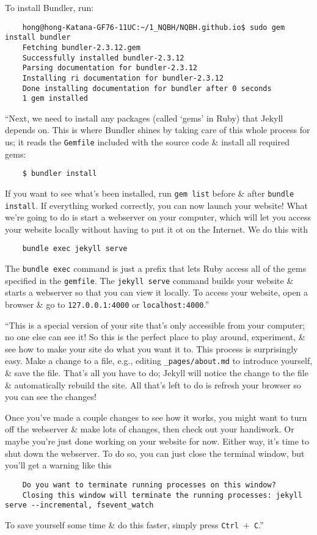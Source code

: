 \documentclass{article}
\numberwithin{equation}{section}
\begin{document}
To install Bundler, run:
\begin{verbatim}
	hong@hong-Katana-GF76-11UC:~/1_NQBH/NQBH.github.io$ sudo gem install bundler
	Fetching bundler-2.3.12.gem
	Successfully installed bundler-2.3.12
	Parsing documentation for bundler-2.3.12
	Installing ri documentation for bundler-2.3.12
	Done installing documentation for bundler after 0 seconds
	1 gem installed
\end{verbatim}
``Next, we need to install any packages (called `gems' in Ruby) that Jekyll depends on. This is where Bundler shines by taking care of this whole process for us; it reads the \texttt{Gemfile} included with the source code \& install all required gems:
\begin{verbatim}
	$ bundler install
\end{verbatim}
If you want to see what's been installed, run \texttt{gem list} before \& after \texttt{bundle install}. If everything worked correctly, you can now launch your website! What we're going to do is start a webserver on your computer, which will let you access your website locally without having to put it ot on the Internet. We do this with
\begin{verbatim}
	bundle exec jekyll serve
\end{verbatim}
The \texttt{bundle exec} command is just a prefix that lets Ruby access all of the gems specified in the \texttt{gemfile}. The \texttt{jekyll serve} command builds your website \& starts a webserver so that you can view it locally. To access your website, open a browser \& go to \texttt{127.0.0.1:4000} or \texttt{localhost:4000}.''

``This is a special version of your site that's only accessible from your computer; no one else can see it! So this is the perfect place to play around, experiment, \& see how to make your site do what you want it to. This process is surprisingly easy. Make a change to a file, e.g., editing \verb|_pages/about.md| to introduce yourself, \& save the file. That's all you have to do; Jekyll will notice the change to the file \& automatically rebuild the site. All that's left to do is refresh your browser so you can see the changes!

Once you've made a couple changes to see how it works, you might want to turn off the webserver \& make lots of changes, then check out your handiwork. Or maybe you're just done working on your website for now. Either way, it's time to shut down the webserver. To do so, you can just close the terminal window, but you'll get a warning like this
\begin{verbatim}
	Do you want to terminate running processes on this window?
	Closing this window will terminate the running processes: jekyll serve --incremental, fsevent_watch
\end{verbatim}
To save yourself some time \& do this faster, simply press \texttt{Ctrl $+$ C}.''
\end{document}
